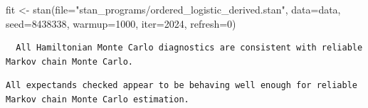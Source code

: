 \documentclass[
  letterpaper,
  DIV=11,
  numbers=noendperiod]{scrartcl}
\newenvironment{Shaded}{\begin{snugshade}}{\end{snugshade}}
\newcommand{\AttributeTok}[1]{\textcolor[rgb]{0.40,0.45,0.13}{#1}}
\newcommand{\ConstantTok}[1]{\textcolor[rgb]{0.56,0.35,0.01}{#1}}
\newcommand{\DecValTok}[1]{\textcolor[rgb]{0.68,0.00,0.00}{#1}}
\newcommand{\FunctionTok}[1]{\textcolor[rgb]{0.28,0.35,0.67}{#1}}
\newcommand{\NormalTok}[1]{\textcolor[rgb]{0.00,0.23,0.31}{#1}}
\newcommand{\OtherTok}[1]{\textcolor[rgb]{0.00,0.23,0.31}{#1}}
\newcommand{\SpecialCharTok}[1]{\textcolor[rgb]{0.37,0.37,0.37}{#1}}
\newcommand{\StringTok}[1]{\textcolor[rgb]{0.13,0.47,0.30}{#1}}
\begin{document}
\begin{Shaded}
\begin{Highlighting}[]
\NormalTok{fit }\OtherTok{\textless{}{-}} \FunctionTok{stan}\NormalTok{(}\AttributeTok{file=}\StringTok{"stan\_programs/ordered\_logistic\_derived.stan"}\NormalTok{,}
            \AttributeTok{data=}\NormalTok{data, }\AttributeTok{seed=}\DecValTok{8438338}\NormalTok{,}
            \AttributeTok{warmup=}\DecValTok{1000}\NormalTok{, }\AttributeTok{iter=}\DecValTok{2024}\NormalTok{, }\AttributeTok{refresh=}\DecValTok{0}\NormalTok{)}
\end{Highlighting}
\end{Shaded}

\begin{Shaded}
\end{Shaded}

\begin{verbatim}
  All Hamiltonian Monte Carlo diagnostics are consistent with reliable
Markov chain Monte Carlo.
\end{verbatim}

\begin{Shaded}
\end{Shaded}

\begin{verbatim}
All expectands checked appear to be behaving well enough for reliable
Markov chain Monte Carlo estimation.
\end{verbatim}
\end{document}
